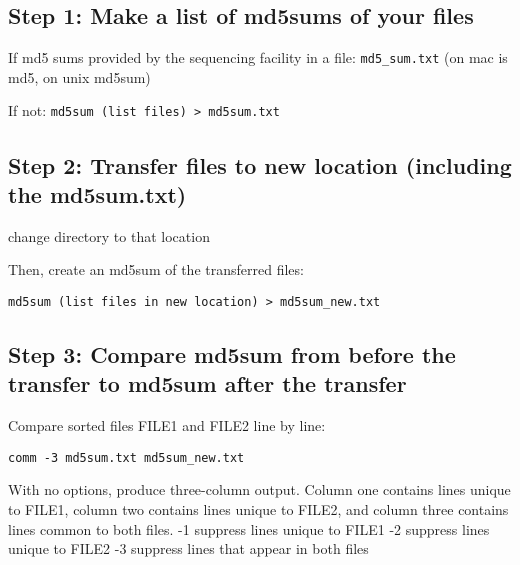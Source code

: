 \documentclass[
  letterpaper,
  DIV=11,
  numbers=noendperiod]{scrreprt}
\begin{document}
\hypertarget{step-1-make-a-list-of-md5sums-of-your-files}{%
\subsection*{\texorpdfstring{\textbf{Step 1: Make a list of md5sums of
your
files}}{Step 1: Make a list of md5sums of your files}}\label{step-1-make-a-list-of-md5sums-of-your-files}}

If md5 sums provided by the sequencing facility in a file:
\texttt{md5\_sum.txt} (on mac is md5, on unix md5sum)

If not: \texttt{md5sum\ (list\ files)\ \textgreater{}\ md5sum.txt}

\hypertarget{step-2-transfer-files-to-new-location-including-the-md5sum.txt}{%
\subsection*{\texorpdfstring{\textbf{Step 2: Transfer files to new
location (including the
md5sum.txt)}}{Step 2: Transfer files to new location (including the md5sum.txt)}}\label{step-2-transfer-files-to-new-location-including-the-md5sum.txt}}

change directory to that location

Then, create an md5sum of the transferred files:

\texttt{md5sum\ (list\ files\ in\ new\ location)\ \textgreater{}\ md5sum\_new.txt}

\hypertarget{step-3-compare-md5sum-from-before-the-transfer-to-md5sum-after-the-transfer}{%
\subsection*{\texorpdfstring{\textbf{Step 3: Compare md5sum from before
the transfer to md5sum after the
transfer}}{Step 3: Compare md5sum from before the transfer to md5sum after the transfer}}\label{step-3-compare-md5sum-from-before-the-transfer-to-md5sum-after-the-transfer}}

Compare sorted files FILE1 and FILE2 line by line:

\texttt{comm\ -3\ md5sum.txt\ md5sum\_new.txt}

With no options, produce three-column output. Column one contains lines
unique to FILE1, column two contains lines unique to FILE2, and column
three contains lines common to both files. -1 suppress lines unique to
FILE1 -2 suppress lines unique to FILE2 -3 suppress lines that appear in
both files
\end{document}

